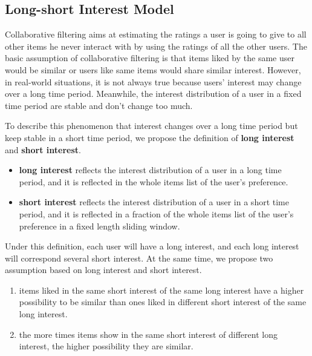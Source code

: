 \documentclass{sig-alternate-05-2015}
\begin{document}
\subsection{Long-short Interest Model}
Collaborative filtering aims at estimating the ratings a user is going to give to
all other items he never interact with by using the ratings of all the other users.
The basic assumption of collaborative filtering is that items liked by the same user
would be similar or users like same items would share similar interest.
However, in real-world situations, it is not always true because users' interest
may change over a long time period.
Meanwhile, the interest distribution of a user in a fixed time period
are stable and don't change too much.

To describe this phenomenon that interest changes over a long time period but
keep stable in a short time period,
we propose the definition of \textbf{long interest} and \textbf{short interest}.

\begin{itemize}
\item \textbf{long interest} reflects the interest distribution of a user
in a long time period, and it is reflected in the whole items list of the user's preference.
\item \textbf{short interest} reflects the interest distribution of a user
in a short time period, and it is reflected in a fraction of the whole items list of
the user's preference in a fixed length sliding window.
\end{itemize}

Under this definition, each user will have a long interest, and each long interest will
correspond several short interest. At the same time,
we propose two assumption based on long interest and short interest.

\begin{enumerate}
\item items liked in the same short interest of the same long interest have a higher
possibility to be similar than ones liked in different short interest of the same long interest.
\item the more times items show in the same short interest of different long interest,
the higher possibility they are similar.
\end{enumerate}
\end{document}
